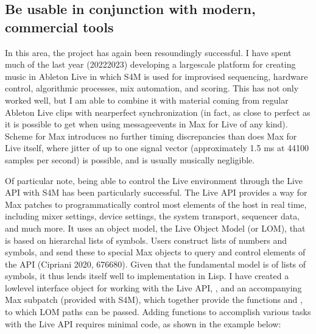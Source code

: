 \documentclass[letterpaper,10pt,english]{sphinxmanual}
\begin{document}
\subsection{Be usable in conjunction with modern, commercial tools}
\label{\detokenize{conclusion:be-usable-in-conjunction-with-modern-commercial-tools}}
\sphinxAtStartPar
In this area, the project has again been resoundingly successful.
I have spent much of the last year (2022\sphinxhyphen{}2023) developing a large\sphinxhyphen{}scale platform for creating music
in Ableton Live in which S4M is used for improvised sequencing, hardware control, algorithmic processes,
mix automation, and scoring. This has not only worked well, but I am able to combine
it with material coming from regular Ableton Live clips with near\sphinxhyphen{}perfect synchronization (in fact,
as close to perfect as it is possible to get when using message\sphinxhyphen{}events in Max for Live of any kind).
Scheme for Max introduces no further timing discrepancies than does Max for Live itself, where
jitter of up to one signal vector (approximately 1.5 ms at 44100 samples per second) is possible, and is
usually musically negligible.

\sphinxAtStartPar
Of particular note, being able to control the Live environment through the Live API with S4M has
been particularly successful. The Live API provides a way for Max patches to programmatically control
most elements of the host in real time, including mixer settings, device settings, the system transport,
sequencer data, and much more. It uses an object model, the Live Object Model (or LOM), that
is based on hierarchal lists of symbols. Users construct lists of numbers and symbols, and send
these to special Max objects to query and control elements of the API (Cipriani 2020, 676\sphinxhyphen{}680).
Given that the fundamental model is of lists of symbols, it thus lends itself well to implementation in Lisp.
I have created a low\sphinxhyphen{}level interface object for working with the Live API, , and an accompanying
Max subpatch (provided with S4M), which together provide the functions
 and , to which LOM paths can be passed.
Adding functions to accomplish various tasks with the Live API
requires minimal code, as shown in the example below:
\end{document}
